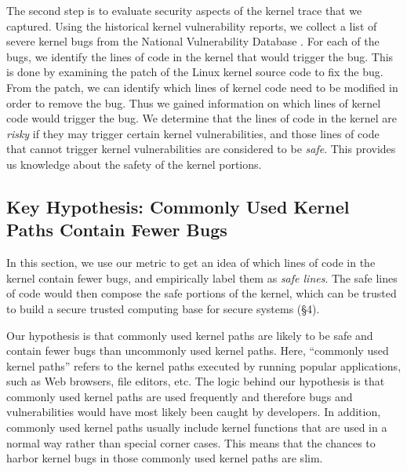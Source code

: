 The second step is to evaluate security aspects of the kernel trace that we captured. Using the historical kernel vulnerability 
reports, we collect a list of severe kernel bugs from the National Vulnerability Database \cite{NVD}. 
For each of the bugs, we identify the lines of code 
in the kernel that would trigger the bug. 
This is done by examining the patch of the Linux kernel source code to fix the bug. 
From the patch, we can identify which lines of kernel code need to be modified in order to remove 
the bug. Thus we gained information on which lines of kernel code would trigger the bug. 
We determine that the lines of code in the kernel are \textit{risky} if they 
may trigger certain kernel vulnerabilities, and those lines of code that cannot trigger kernel vulnerabilities are 
considered to be \textit{safe}. This provides us knowledge about the safety of the kernel portions.

\subsection{Key Hypothesis: Commonly Used Kernel Paths Contain Fewer Bugs}
In this section, we use our metric to get an idea of which lines of code in the kernel contain fewer bugs, and empirically label 
them as \textit{safe lines}. The safe lines of code would then compose the safe portions of the kernel, which can 
be trusted to build a secure trusted computing base for secure systems (\S{4}). 

Our hypothesis is that commonly used kernel paths are likely to be safe and contain fewer bugs 
than uncommonly used kernel paths. 
Here, ``commonly used kernel paths'' refers to the kernel paths executed by running popular 
applications, such as Web browsers, file editors, etc. 
The logic behind our hypothesis is that commonly used kernel paths are used
frequently and therefore bugs and vulnerabilities would have most likely
been caught by developers.  In addition, commonly used kernel paths usually 
include kernel functions that are used in a normal way rather than special 
corner cases. This means that the chances 
to harbor kernel bugs in those commonly used kernel paths are slim. 

